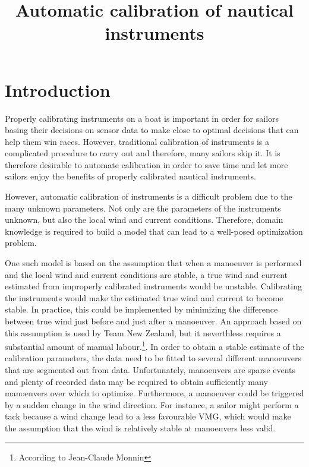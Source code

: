 \title{Automatic calibration of nautical instruments}

\section{Introduction}
Properly calibrating instruments on a boat is important in order for sailors basing their decisions on sensor data to make close to optimal decisions that can help them win races. However, traditional calibration of instruments is a complicated procedure to carry out and therefore, many sailors skip it. It is therefore desirable to automate calibration in order to save time and let more sailors enjoy the benefits of properly calibrated nautical instruments.

However, automatic calibration of instruments is a difficult problem due to the many unknown parameters. Not only are the parameters of the instruments unknown, but also the local wind and current conditions. Therefore, domain knowledge is required to build a model that can lead to a well-posed optimization problem.

One such model is based on the assumption that when a manoeuver is performed and the local wind and current conditions are stable, a true wind and current estimated from improperly calibrated instruments would be unstable. Calibrating the instruments would make the estimated true wind and current to become stable. In practice, this could be implemented by minimizing the difference between true wind just before and just after a manoeuver. An approach based on this assumption is used by Team New Zealand, but it neverthless requires a substantial amount of manual labour.\footnote{According to Jean-Claude Monnin}. In order to obtain a stable estimate of the calibration parameters, the data need to be fitted to several different manoeuvers that are segmented out from data. Unfortunately, manoeuvers are sparse events and plenty of recorded data may be required to obtain sufficiently many manoeuvers over which to optimize. Furthermore, a manoeuver could be triggered by a sudden change in the wind direction. For instance, a sailor might perform a tack because a wind change lead to a less favourable VMG, which would make the assumption that the wind is relatively stable at manoeuvers less valid.

